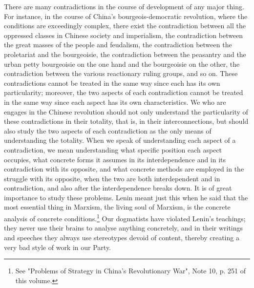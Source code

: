 \documentclass{article}
\begin{document}
There are many contradictions in the course of development of any major thing.
For instance, in the course of China's bourgeois-democratic revolution, where
the conditions are exceedingly complex, there exist the contradiction between
all the oppressed classes in Chinese society and imperialism, the contradiction
between the great masses of the people and feudalism, the contradiction between
the proletariat and the bourgeoisie, the contradiction between the peasantry
and the urban petty bourgeoisie on the one hand and the bourgeoisie on the
other, the contradiction between the various reactionary ruling groups, and so
on. These contradictions cannot be treated in the same way since each has its
own particularity; moreover, the two aspects of each contradiction cannot be
treated in the same way since each aspect has its own characteristics. We who
are engages in the Chinese revolution should not only understand the
particularity of these contradictions in their totality, that is, in their
interconnections, but should also study the two aspects of each contradiction
as the only means of understanding the totality. When we speak of understanding
each aspect of a contradiction, we mean understanding what specific position
each aspect occupies, what concrete forms it assumes in its interdependence and
in its contradiction with its opposite, and what concrete methods are employed
in the struggle with its opposite, when the two are both interdependent and in
contradiction, and also after the interdependence breaks down. It is of great
importance to study these problems. Lenin meant just this when he said that the
most essential thing in Marxism, the living soul of Marxism, is the concrete
analysis of concrete conditions.\footnote{See "Problems of Strategy in China's Revolutionary War", Note 10, p. 251 of this volume.} Our dogmatists have violated Lenin's
teachings; they never use their brains to analyse anything concretely, and in
their writings and speeches they always use stereotypes devoid of content,
thereby creating a very bad style of work in our Party.
\end{document}
